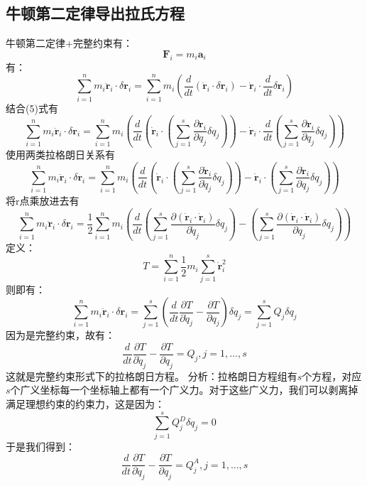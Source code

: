 \documentclass[a4paper, 10pt, openany]{book}%
\begin{document}
    \subsection{牛顿第二定律导出拉氏方程}
    牛顿第二定律+完整约束有：
    $$\textbf{F}_i=m_i\textbf{a}_i$$
    有：
    $$\sum_{i=1}^n m_i \ddot{\textbf{r}}_i\cdot \delta \textbf{r}_i=\sum_{i=1}^n m_i (\frac{d}{dt}(\dot{\textbf{r}}_i\cdot \delta \textbf{r}_i)-\dot{\textbf{r}}_i\cdot \frac{d}{dt} \delta \textbf{r}_i)$$
    结合(5)式有
    $$\sum_{i=1}^n m_i \ddot{\textbf{r}}_i\cdot \delta \textbf{r}_i=\sum_{i=1}^n m_i (\frac{d}{dt}(\dot{\textbf{r}}_i\cdot (\sum_{j=1}^s \frac{\partial \textbf{r}_i}{\partial q_j}\delta q_j))-\dot{\textbf{r}}_i\cdot \frac{d}{dt} (\sum_{j=1}^s \frac{\partial \textbf{r}_i}{\partial q_j}\delta q_j))$$
    使用两类拉格朗日关系有
    $$\sum_{i=1}^n m_i \ddot{\textbf{r}}_i\cdot \delta \textbf{r}_i=\sum_{i=1}^n m_i (\frac{d}{dt}(\dot{\textbf{r}}_i\cdot (\sum_{j=1}^s \frac{\partial \dot{\textbf{r}}_i}{\partial \dot{q}_j}\delta q_j))-\dot{\textbf{r}}_i\cdot (\sum_{j=1}^s \frac{\partial \dot{\textbf{r}}_i}{\partial q_j}\delta q_j))$$
    将r点乘放进去有
    $$\sum_{i=1}^n m_i \ddot{\textbf{r}}_i\cdot \delta \textbf{r}_i=\frac{1}{2}\sum_{i=1}^n m_i (\frac{d}{dt} (\sum_{j=1}^s \frac{\partial (\dot{\textbf{r}}_i\cdot\dot{\textbf{r}}_i)}{\partial \dot{q}_j}\delta q_j)- (\sum_{j=1}^s \frac{\partial (\dot{\textbf{r}}_i\cdot\dot{\textbf{r}}_i)}{\partial q_j}\delta q_j))$$
    定义：
    \begin{equation}
        T=\sum_{i=1}^n \frac{1}{2}m_i\sum_{j=1}^s \dot{\textbf{r}}^2_i
    \end{equation}
    则即有：
    \begin{equation}
        \sum_{i=1}^n m_i \ddot{\textbf{r}}_i\cdot \delta \textbf{r}_i=\sum_{j=1}^s(\frac{d}{dt}\frac{\partial T}{\partial \dot{q}_j}-\frac{\partial T}{\partial q_j})\delta q_j=\sum_{j=1}^s Q_j\delta q_j
    \end{equation}
    因为是完整约束，故有：
    \begin{equation}
        \frac{d}{dt}\frac{\partial T}{\partial \dot{q}_j}-\frac{\partial T}{\partial q_j}=Q_j,j=1,\dots,s
    \end{equation}
    这就是完整约束形式下的拉格朗日方程。
    分析：拉格朗日方程组有$s$个方程，对应$s$个广义坐标每一个坐标轴上都有一个广义力。对于这些广义力，我们可以剥离掉满足理想约束的约束力，这是因为：
    $$\sum_{j=1}^s Q^D_j\delta q_j=0$$
    于是我们得到：
    \begin{equation}
      \frac{d}{dt}\frac{\partial T}{\partial \dot{q}_j}-\frac{\partial T}{\partial q_j}=Q_j^A,j=1,\dots,s
    \end{equation}
\end{document}
